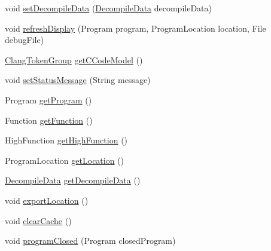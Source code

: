 \begin{DoxyCompactItemize}
\item 
void \mbox{\hyperlink{classghidra_1_1app_1_1decompiler_1_1component_1_1_decompiler_controller_a356099cd8c037d53eb60317815d7586a}{set\+Decompile\+Data}} (\mbox{\hyperlink{classghidra_1_1app_1_1decompiler_1_1component_1_1_decompile_data}{Decompile\+Data}} decompile\+Data)
\item 
void \mbox{\hyperlink{classghidra_1_1app_1_1decompiler_1_1component_1_1_decompiler_controller_aacd96bcc0c2f85e8e96bde2ad5fd71d7}{refresh\+Display}} (Program program, Program\+Location location, File debug\+File)
\item 
\mbox{\hyperlink{classghidra_1_1app_1_1decompiler_1_1_clang_token_group}{Clang\+Token\+Group}} \mbox{\hyperlink{classghidra_1_1app_1_1decompiler_1_1component_1_1_decompiler_controller_a5030159d194659d184eaf4569726bb05}{get\+C\+Code\+Model}} ()
\item 
void \mbox{\hyperlink{classghidra_1_1app_1_1decompiler_1_1component_1_1_decompiler_controller_a7f9c30484cff31540728dac99886488e}{set\+Status\+Message}} (String message)
\item 
Program \mbox{\hyperlink{classghidra_1_1app_1_1decompiler_1_1component_1_1_decompiler_controller_a8ac46f8ce844a53344fc6ccf60f0eee4}{get\+Program}} ()
\item 
Function \mbox{\hyperlink{classghidra_1_1app_1_1decompiler_1_1component_1_1_decompiler_controller_a30967cec17162ffd4c107182e0835905}{get\+Function}} ()
\item 
High\+Function \mbox{\hyperlink{classghidra_1_1app_1_1decompiler_1_1component_1_1_decompiler_controller_aee461c894e3925775b4444fec34edc35}{get\+High\+Function}} ()
\item 
Program\+Location \mbox{\hyperlink{classghidra_1_1app_1_1decompiler_1_1component_1_1_decompiler_controller_a80c1e9eb44608b4b7d04a513e29feb24}{get\+Location}} ()
\item 
\mbox{\hyperlink{classghidra_1_1app_1_1decompiler_1_1component_1_1_decompile_data}{Decompile\+Data}} \mbox{\hyperlink{classghidra_1_1app_1_1decompiler_1_1component_1_1_decompiler_controller_a4ee0f6c3fe8b310fb71faefb1ee3ce99}{get\+Decompile\+Data}} ()
\item 
void \mbox{\hyperlink{classghidra_1_1app_1_1decompiler_1_1component_1_1_decompiler_controller_a44c803e49982c114b829c62bd114b7d7}{export\+Location}} ()
\item 
void \mbox{\hyperlink{classghidra_1_1app_1_1decompiler_1_1component_1_1_decompiler_controller_a25f18cefdf4ffabb3de1970ebcc110b9}{clear\+Cache}} ()
\item 
void \mbox{\hyperlink{classghidra_1_1app_1_1decompiler_1_1component_1_1_decompiler_controller_a54c7bffb7bb2a181553cc3679315df7e}{program\+Closed}} (Program closed\+Program)
\end{DoxyCompactItemize}


